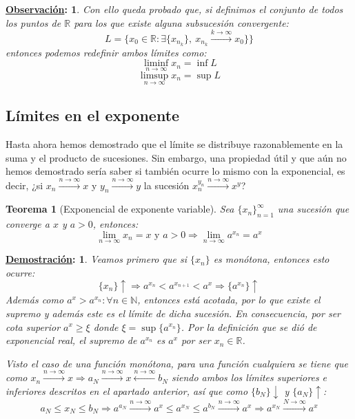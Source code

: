 \documentclass[10pt,a4paper,openright]{book}
\theoremstyle{break}
\newtheorem*{theo}{Teorema}
\newtheorem*{demo}{\underline{Demostración}:}
\newtheorem*{obs}{\underline{Observación}:}
\begin{document}
\begin{obs}
Con ello queda probado que, si definimos el conjunto de todos los puntos de $\mathbb{R}$ para los que existe alguna subsucesión convergente:
$$L=\{x_0\in \mathbb R: \exists \{x_{n_k}\}, \ x_{n_k}\xrightarrow{k\rightarrow \infty} x_0\}\}$$
entonces podemos redefinir ambos límites como:
$$\liminf_{n\rightarrow\infty}x_n=\inf L$$
$$\limsup_{n\rightarrow\infty}x_n=\sup L$$
\end{obs}

\subsection{Límites en el exponente}
Hasta ahora hemos demostrado que el límite se distribuye razonablemente en la suma y el producto de sucesiones. Sin embargo, una propiedad útil y que aún no hemos demostrado sería saber si también ocurre lo mismo con la exponencial, es decir, ¿si $x_n \xrightarrow{n\rightarrow \infty} x$ y $y_n \xrightarrow{n\rightarrow \infty} y$ la sucesión $x_n^{y_n} \xrightarrow{n\rightarrow \infty} x^y$?

\begin{theo}[Exponencial de exponente variable]
Sea $\{x_n\}_{n=1}^\infty$ una sucesión que converge a $x$ y $a>0$, entonces:
$$\lim_{n\rightarrow \infty} x_n = x \mbox{ y }a>0\Rightarrow \lim_{n\rightarrow\infty} a^{x_n}=a^x$$
\end{theo}
\begin{demo}
Veamos primero que si $\{x_n\}$ es monótona, entonces esto ocurre:
$$\{x_n\}\uparrow\Rightarrow a^{x_n}<a^{x_{n+1}}<a^x \Rightarrow \{a^{x_n}\} \uparrow$$
Además como $a^x>a^{x_n}:\forall n\in \mathbb N$, entonces está acotada, por lo que existe el supremo y además este es el límite de dicha sucesión. En consecuencia, por ser cota superior $a^x\geq \xi$ donde $\xi=\sup\{a^{x_n}\}$. Por la definición que se dió de exponencial real, el supremo de $a^{x_n}$ es $a^x$ por ser $x_n\in \mathbb R$.

Visto el caso de una función monótona, para una función cualquiera se tiene que como $x_n\xrightarrow{n\rightarrow\infty} x\Rightarrow a_N\xrightarrow{n\rightarrow\infty}x\xleftarrow{n\rightarrow\infty} b_N$ siendo ambos los límites superiores e inferiores descritos en el apartado anterior, así que como $\{b_N\}\downarrow$ y $\{a_N\}\uparrow$:
$$a_N\leq x_N\leq b_N \Rightarrow a^{a_N}\xrightarrow{n\rightarrow\infty}a^x\leq a^{x_N}\leq a^{b_N}\xrightarrow{n\rightarrow\infty}a^x\Rightarrow a^{x_N}\xrightarrow{N\rightarrow\infty}a^x$$
\end{demo}
\end{document}
